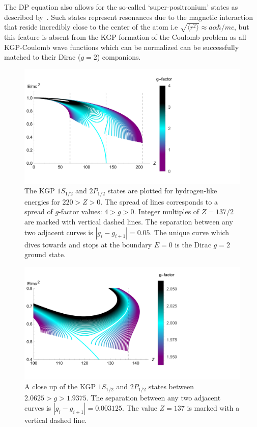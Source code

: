 The DP equation also allows for the so-called `super-positronium' states as described by~\cite{Barut:1975hz,Barut:1976hs}. Such states represent resonances due to the magnetic interaction that reside incredibly close to the center of the atom i.e $\sqrt{\langle r^{2}\rangle}\approx a\alpha\hbar/mc$, but this feature is absent from the KGP formation of the Coulomb problem as all KGP-Coulomb wave functions which can be normalized can be successfully matched to their Dirac ($g\!=\!2$) companions.

\begin{figure}[ht]
    \centering
    \includegraphics[clip, trim=0.0cm 0.0cm 16.0cm 0.0cm,width=0.90\linewidth]{plots/chap02moment/lanplot06.pdf}
     \caption{The KGP $1S_{1/2}$ and $2P_{1/2}$ states are plotted for hydrogen-like energies for $220>Z>0$. The spread of lines corresponds to a spread of $g$-factor values: $4>g>0$. Integer multiples of $Z=137/2$ are marked with vertical dashed lines. The separation between any two adjacent curves is $|g_{i}-g_{i+1}|=0.05$. The unique curve which dives towards and stops at the boundary $E=0$ is the Dirac $g=2$ ground state.}
    \label{fig:gspec1}
\end{figure}

\begin{figure}[ht]
    \centering
    \includegraphics[clip, trim=0.0cm 0.0cm 8.0cm 0.0cm,width=0.90\linewidth]{plots/chap02moment/lanplot05.pdf}
     \caption{A close up of the KGP $1S_{1/2}$ and $2P_{1/2}$ states between $2.0625>g>1.9375$. The separation between any two adjacent curves is $|g_{i}-g_{i+1}|=0.003125$. The value $Z=137$ is marked with a vertical dashed line.}
    \label{fig:gspec2}
\end{figure}

